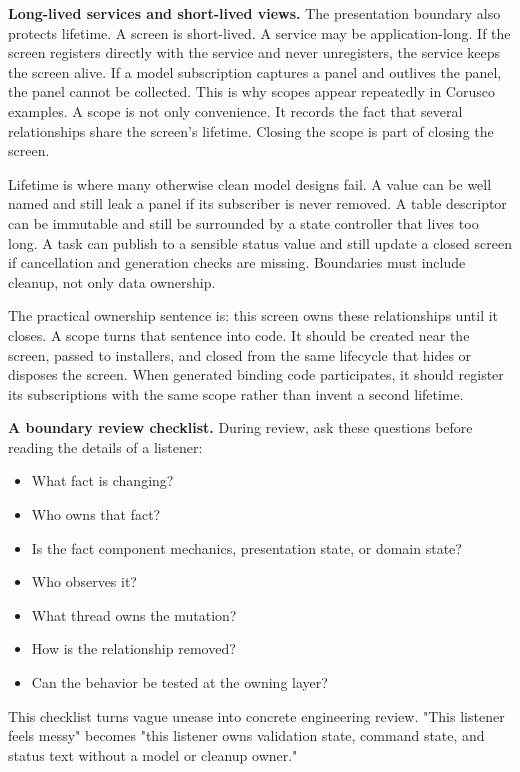 \textbf{Long-lived services and short-lived views.} The presentation boundary also protects lifetime. A screen is short-lived. A service may be application-long. If the screen registers directly with the service and never unregisters, the service keeps the screen alive. If a model subscription captures a panel and outlives the panel, the panel cannot be collected. This is why scopes appear repeatedly in Corusco examples. A scope is not only convenience. It records the fact that several relationships share the screen's lifetime. Closing the scope is part of closing the screen.

Lifetime is where many otherwise clean model designs fail. A value can be well named and still leak a panel if its subscriber is never removed. A table descriptor can be immutable and still be surrounded by a state controller that lives too long. A task can publish to a sensible status value and still update a closed screen if cancellation and generation checks are missing. Boundaries must include cleanup, not only data ownership.

The practical ownership sentence is: this screen owns these relationships until it closes. A scope turns that sentence into code. It should be created near the screen, passed to installers, and closed from the same lifecycle that hides or disposes the screen. When generated binding code participates, it should register its subscriptions with the same scope rather than invent a second lifetime.

\textbf{A boundary review checklist.} During review, ask these questions before reading the details of a listener:

\begin{itemize}
\item What fact is changing?
\item Who owns that fact?
\item Is the fact component mechanics, presentation state, or domain state?
\item Who observes it?
\item What thread owns the mutation?
\item How is the relationship removed?
\item Can the behavior be tested at the owning layer?
\end{itemize}

This checklist turns vague unease into concrete engineering review. "This listener feels messy" becomes "this listener owns validation state, command state, and status text without a model or cleanup owner."

